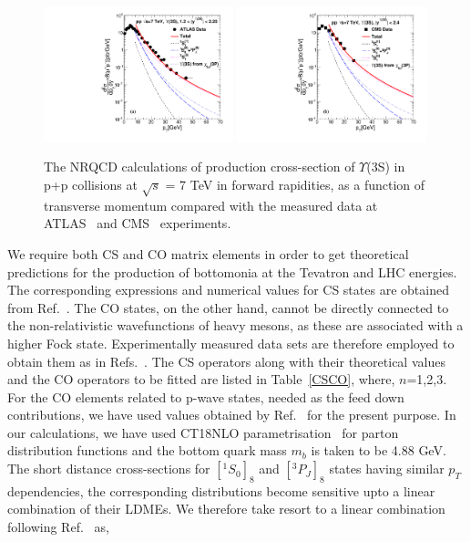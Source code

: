 \documentclass[review]{elsarticle}
\begin{document}
\begin{figure}[!h]
  \centering
  \includegraphics[width=0.49\textwidth]{Figures/NRQCD_Beauty/Fig2a_Y3S_ATLAS_Rap12225.pdf}
  \includegraphics[width=0.49\textwidth]{Figures/NRQCD_Beauty/Fig2b_Y3S_CMS_Rapl24.pdf} 
  \caption{\small{The NRQCD calculations of production cross-section of $\Upsilon$(3S) in p+p collisions at 
      $\sqrt{s}$ = 7 TeV in forward rapidities, as a function of transverse momentum compared with the measured data 
      at ATLAS~\cite{Aad:2012dlq} and CMS~\cite{Chatrchyan:2013yna} experiments. }}
  \label{Fig:SigmaY3SCMS_forwardRap}
\end{figure}


We require both CS and CO matrix elements in order to get theoretical
predictions for the production of bottomonia at the Tevatron and LHC energies.
The corresponding expressions and
numerical values for CS states are obtained from Ref.~\cite{Brateen:PRD2001}.
The CO states, on the other hand, cannot be directly connected to the non-relativistic
wavefunctions of heavy mesons,
as these are associated with a higher Fock state. Experimentally measured data sets are 
therefore employed to obtain them as in Refs.~\cite{Brateen:PRD2001,Cho:1995vh,Cho:1995ce}. 
The CS operators along with their theoretical values
and the CO operators to be fitted are listed in Table~\ref{CSCO},
where, $n$=1,2,3. For the CO elements related to p-wave states, needed as the 
feed down contributions, we have used values obtained by Ref.~\cite{Sharma:2012dy,Feng:2015wka} for the 
present purpose. In our calculations, we have used
CT18NLO parametrisation~\cite{Hou:2019efy} for parton distribution functions and 
the bottom quark mass $m_b$ is taken to be 4.88 GeV.
The short distance cross-sections for $[^1S_0]_8$ and $[^3P_J]_8$ states having similar 
$p_T$ dependencies, the corresponding distributions become sensitive upto a linear combination
of their LDMEs. We therefore take resort to a linear combination following
Ref.~\cite{Kumar:2016ojy} as,
\end{document}
